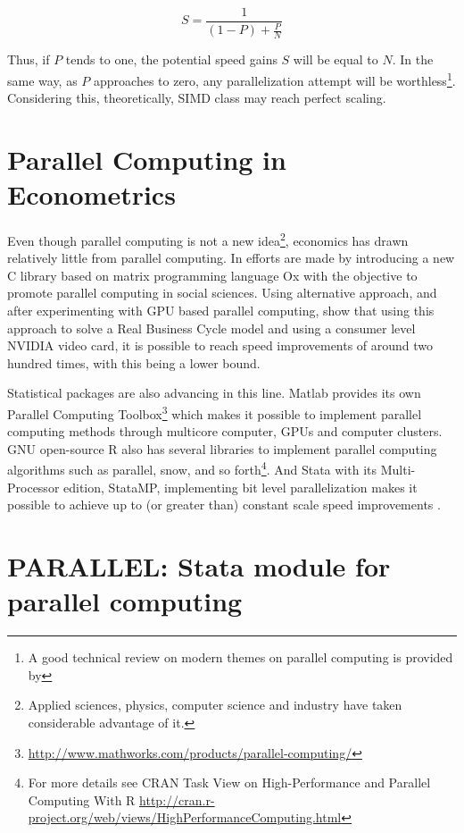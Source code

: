 \documentclass[letterpaper, 10pt]{article}
\begin{document}
\begin{equation}
S = \frac{1}{(1-P) + \frac{P}{N}}
\end{equation}

Thus, if $P$ tends to one, the potential speed gains $S$ will be equal to $N$. In the same way, as $P$ approaches to zero, any parallelization attempt will be worthless\footnote{A good technical review on modern themes on parallel computing is provided by }. Considering this, theoretically, SIMD class may reach perfect scaling.

\section{Parallel Computing in Econometrics}

Even though parallel computing is not a new idea\footnote{Applied sciences, physics, computer science and industry have taken considerable advantage of it.}, economics has drawn relatively little from parallel computing. In  efforts are made by introducing a new C library based on matrix programming language Ox with the objective to promote parallel computing in social sciences. Using alternative approach, and after experimenting with GPU based parallel computing,  show that using this approach to solve a Real Business Cycle model and using a consumer level NVIDIA video card, it is possible to reach speed improvements of around two hundred times, with this being a lower bound.

Statistical packages are also advancing in this line. Matlab provides its own Parallel Computing Toolbox\footnote{\url{http://www.mathworks.com/products/parallel-computing/}} which makes it possible to implement parallel computing methods through multicore computer, GPUs and computer clusters. GNU open-source R also has several libraries to implement parallel computing algorithms such as parallel, snow, and so forth\footnote{For more details see CRAN Task View on High-Performance and Parallel Computing With R \url{http://cran.r-project.org/web/views/HighPerformanceComputing.html}}. And Stata with its Multi-Processor edition, StataMP, implementing bit level parallelization makes it possible to achieve up to (or greater than) constant scale speed improvements \cite{stata2010}.

\section{PARALLEL: Stata module for parallel computing}
\end{document}

